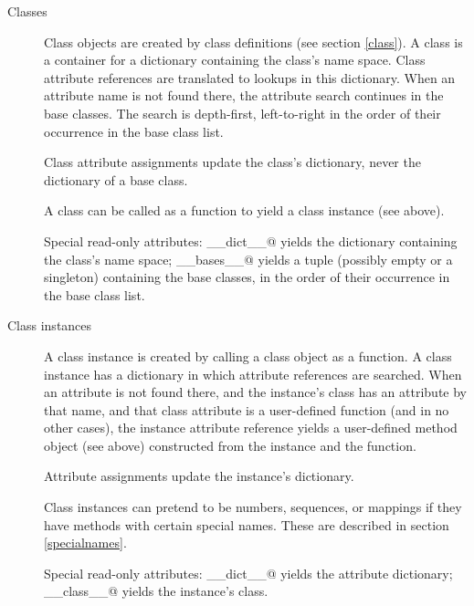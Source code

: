 \begin{description}
\item[Classes]
Class objects are created by class definitions (see section
\ref{class}).  A class is a container for a dictionary containing the
class's name space.  Class attribute references are translated to
lookups in this dictionary.  When an attribute name is not found
there, the attribute search continues in the base classes.  The search
is depth-first, left-to-right in the order of their occurrence in the
base class list.

Class attribute assignments update the class's dictionary, never the
dictionary of a base class.

A class can be called as a function to yield a class instance (see
above).

Special read-only attributes: \verb@__dict__@ yields the dictionary
containing the class's name space; \verb@__bases__@ yields a tuple
(possibly empty or a singleton) containing the base classes, in the
order of their occurrence in the base class list.

\item[Class instances]
A class instance is created by calling a class object as a
function.  A class instance has a dictionary in which
attribute references are searched.  When an attribute is not found
there, and the instance's class has an attribute by that name, and
that class attribute is a user-defined function (and in no other
cases), the instance attribute reference yields a user-defined method
object (see above) constructed from the instance and the function.

Attribute assignments update the instance's dictionary.

Class instances can pretend to be numbers, sequences, or mappings if
they have methods with certain special names.  These are described in
section \ref{specialnames}.

Special read-only attributes: \verb@__dict__@ yields the attribute
dictionary; \verb@__class__@ yields the instance's class.


\end{description}
